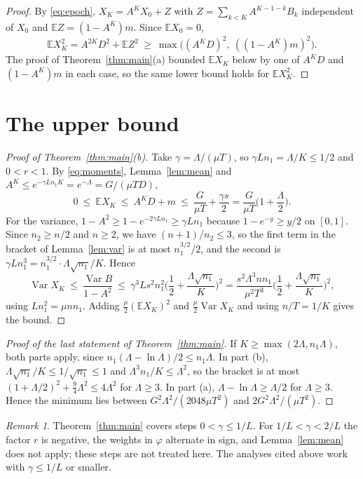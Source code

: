\documentclass[11pt]{amsart}
\theoremstyle{remark}\newtheorem{remark}[theorem]{Remark}
\newcommand{\E}{\mathbb{E}}
\newcommand{\Var}{\operatorname{Var}}
\begin{document}
\begin{proof}
By \eqref{eq:epoch}, $X_K=A^KX_0+Z$ with $Z=\sum_{k<K}A^{K-1-k}B_k$ independent of $X_0$ and $\E Z=(1-A^K)m$. Since
$\E X_0=0$,
\[
\E X_K^2=A^{2K}D^2+\E Z^2\ \ge\ \max\big((A^KD)^2,\ ((1-A^K)m)^2\big).
\]
The proof of Theorem~\ref{thm:main}(a) bounded $\E X_K$ below by one of $A^KD$ and $(1-A^K)m$ in each case, so the same
lower bound holds for $\E X_K^2$.
\end{proof}

\section{The upper bound}\label{sec:upper}

\begin{proof}[Proof of Theorem~\ref{thm:main}(b)]
Take $\gamma=\Lambda/(\mu T)$, so $\gamma Ln_1=\Lambda/K\le1/2$ and $0<r<1$. By \eqref{eq:moments}, Lemma~\ref{lem:mean}
and $A^K\le e^{-\gamma Ln_1K}=e^{-\Lambda}=G/(\mu TD)$,
\[
0\ \le\ \E X_K\ \le\ A^KD+m\ \le\ \frac{G}{\mu T}+\frac{\gamma s}{2}=\frac{G}{\mu T}\Big(1+\frac\Lambda2\Big).
\]
For the variance, $1-A^2\ge1-e^{-2\gamma Ln_1}\ge\gamma Ln_1$ because $1-e^{-y}\ge y/2$ on $[0,1]$. Since
$n_2\ge n/2$ and $n\ge2$, we have $(n+1)/n_2\le3$, so the first term in the bracket of Lemma~\ref{lem:var} is at most
$n_1^{3/2}/2$, and the second is $\gamma Ln_1^3=n_1^{3/2}\cdot\Lambda\sqrt{n_1}/K$. Hence
\[
\Var X_K\ \le\ \frac{\Var B}{1-A^2}\ \le\ \gamma^3Ls^2n_1^2\Big(\frac12+\frac{\Lambda\sqrt{n_1}}{K}\Big)^2
=\frac{s^2\Lambda^3nn_1}{\mu^2T^3}\Big(\frac12+\frac{\Lambda\sqrt{n_1}}{K}\Big)^2,
\]
using $Ln_1^2=\mu nn_1$. Adding $\frac\mu2(\E X_K)^2$ and $\frac\mu2\Var X_K$ and using $n/T=1/K$ gives the bound.
\end{proof}

\begin{proof}[Proof of the last statement of Theorem~\ref{thm:main}]
If $K\ge\max(2\Lambda,n_1\Lambda)$, both parts apply, since $n_1(\Lambda-\ln\Lambda)/2\le n_1\Lambda$. In part (b),
$\Lambda\sqrt{n_1}/K\le1/\sqrt{n_1}\le1$ and $\Lambda^3n_1/K\le\Lambda^2$, so the bracket is at most
$(1+\Lambda/2)^2+\frac94\Lambda^2\le4\Lambda^2$ for $\Lambda\ge3$. In part (a), $\Lambda-\ln\Lambda\ge\Lambda/2$ for
$\Lambda\ge3$. Hence the minimum lies between $G^2\Lambda^2/(2048\mu T^2)$ and $2G^2\Lambda^2/(\mu T^2)$.
\end{proof}

\begin{remark}
Theorem~\ref{thm:main} covers steps $0<\gamma\le1/L$. For $1/L<\gamma<2/L$ the factor $r$ is negative, the weights in
$\varphi$ alternate in sign, and Lemma~\ref{lem:mean} does not apply; these steps are not treated here. The analyses
cited above work with $\gamma\le1/L$ or smaller.
\end{remark}
\end{document}
